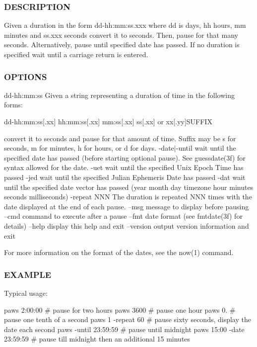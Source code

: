 \subsubsection*{D\+E\+S\+C\+R\+I\+P\+T\+I\+ON}

Given a duration in the form dd-\/hh\+:mm\+:ss.\+xxx where dd is days, hh hours, mm minutes and ss.\+xxx seconds convert it to seconds. Then, pause for that many seconds. Alternatively, pause until specified date has passed. If no duration is specified wait until a carriage return is entered.

\subsubsection*{O\+P\+T\+I\+O\+NS}

dd-\/hh\+:mm\+:ss Given a string representing a duration of time in the following forms\+:

dd-\/hh\+:mm\+:ss\mbox{[}.xx\mbox{]} hh\+:mm\+:ss\mbox{[}.xx\mbox{]} mm\+:ss\mbox{[}.xx\mbox{]} ss\mbox{[}.xx\mbox{]} or xx\mbox{[}.yy\mbox{]}S\+U\+F\+F\+IX

convert it to seconds and pause for that amount of time. Suffix may be s for seconds, m for minutes, h for hours, or d for days. -\/date$\vert$-\/until wait until the specified date has passed (before starting optional pause). See guessdate(3f) for syntax allowed for the date. -\/uet wait until the specified Unix Epoch Time has passed -\/jed wait until the specified Julian Ephemeris Date has passed -\/dat wait until the specified date vector has passed (year month day timezone hour minutes seconds milliseconds) -\/repeat N\+NN The duration is repeated N\+NN times with the date displayed at the end of each pause. --msg message to display before pausing --cmd command to execute after a pause --fmt date format (see fmtdate(3f) for details) --help display this help and exit --version output version information and exit

For more information on the format of the dates, see the now(1) command.

\subsubsection*{E\+X\+A\+M\+P\+LE}

Typical usage\+:

paws 2\+:00\+:00 \# pause for two hours paws 3600 \# pause one hour paws 0. \# pause one tenth of a second paws 1 -\/repeat 60 \# pause sixty seconds, display the date each second paws -\/until 23\+:59\+:59 \# pause until midnight paws 15\+:00 -\/date 23\+:59\+:59 \# pause till midnight then an additional 15 minutes 

